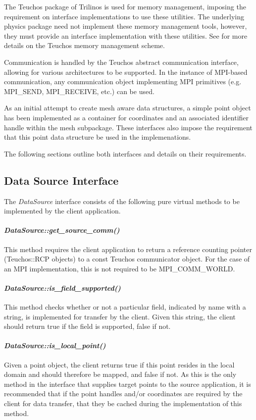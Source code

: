 \documentclass[letterpaper]{article}
\begin{document}
The Teuchos package of Trilinos is used for memory management,
imposing the requirement on interface implementations to use these
utilities. The underlying physics package need not implement these
memory management tools, however, they must provide an interface
implementation with these utilities. See \cite{Bartlett_2010} for more
details on the Teuchos memory management scheme.

Communication is handled by the Teuchos abstract communication
interface, allowing for various architectures to be supported. In the
instance of MPI-based communication, any communication object
implementing MPI primitives (e.g. MPI\_SEND, MPI\_RECEIVE, etc.) can
be used. 

As an initial attempt to create mesh aware data structures, a simple
point object has been implemented as a container for coordinates and
an associated identifier handle within the mesh subpackage. These
interfaces also impose the requirement that this point data structure
be used in the implemenations.

The following sections outline both interfaces and details on their
requirements. 

\subsection{Data Source Interface}
The {\sl DataSource} interface consists of the following pure
virtual methods to be implemented by the client application.

\paragraph{\sl DataSource::get\_source\_comm()}
This method requires the client application to return a reference
counting pointer (Teuchos::RCP objects) to a const Teuchos
communicator object. For the case of an MPI implementation, this is
not required to be MPI\_COMM\_WORLD.

\paragraph{\sl DataSource::is\_field\_supported()}
This method checks whether or not a particular field, indicated by
name with a string, is implemented for transfer by the client. Given
this string, the client should return true if the field is supported,
false if not.

\paragraph{\sl DataSource::is\_local\_point()}
Given a point object, the client returns true if this point resides in
the local domain and should therefore be mapped, and false if not. As
this is the only method in the interface that supplies target points
to the source application, it is recommended that if the point handles
and/or coordinates are required by the client for data transfer, that
they be cached during the implementation of this method. 
\end{document}
